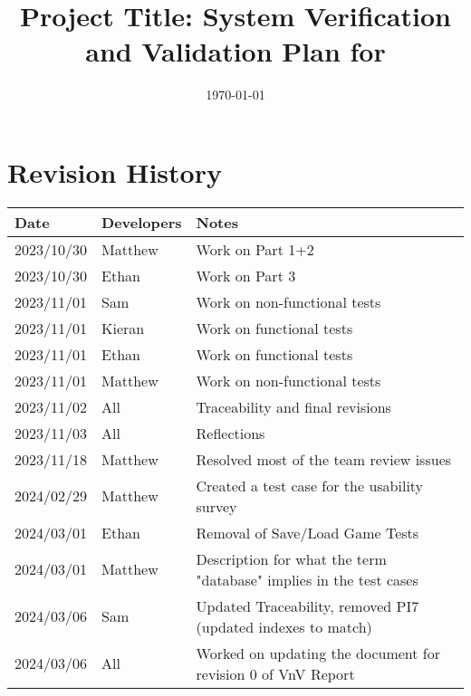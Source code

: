 \documentclass[12pt, titlepage]{article}
\begin{document}
\title{Project Title: System Verification and Validation Plan for \progname{}} 
\author{\authname}
\date{\today}
	
\maketitle


\section*{Revision History}

\begin{tabularx}{\textwidth}{p{3cm}p{2cm}X}
\toprule {\bf Date} & {\bf Developers} & {\bf Notes}\\
\midrule
2023/10/30 & Matthew & Work on Part 1+2\\
2023/10/30 & Ethan & Work on Part 3\\
2023/11/01 & Sam & Work on non-functional tests\\
2023/11/01 & Kieran & Work on functional tests\\
2023/11/01 & Ethan & Work on functional tests\\
2023/11/01 & Matthew & Work on non-functional tests\\
2023/11/02 & All & Traceability and final revisions\\
2023/11/03 & All & Reflections\\
2023/11/18 & Matthew & Resolved most of the team review issues\\
2024/02/29 & Matthew & Created a test case for the usability survey\\
2024/03/01 & Ethan & Removal of Save/Load Game Tests\\
2024/03/01 & Matthew & Description for what the term "database" implies in the test cases\\
2024/03/06 & Sam & Updated Traceability, removed PI7 (updated indexes to match)\\
2024/03/06 & All & Worked on updating the document for revision 0 of VnV Report\\
\bottomrule
\end{tabularx}

~\\
\end{document}
